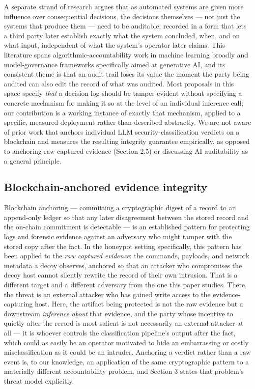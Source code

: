 \documentclass[journal,10pt,twocolumn]{IEEEtran}
\begin{document}
A separate strand of research argues that as automated systems are given more influence over consequential decisions, the decisions themselves --- not just the systems that produce them --- need to be auditable: recorded in a form that lets a third party later establish exactly what the system concluded, when, and on what input, independent of what the system's operator later claims. This literature spans algorithmic-accountability work in machine learning broadly and model-governance frameworks specifically aimed at generative AI, and its consistent theme is that an audit trail loses its value the moment the party being audited can also edit the record of what was audited. Most proposals in this space specify \emph{that} a decision log should be tamper-evident without specifying a concrete mechanism for making it so at the level of an individual inference call; our contribution is a working instance of exactly that mechanism, applied to a specific, measured deployment rather than described abstractly. We are not aware of prior work that anchors individual LLM security-classification verdicts on a blockchain and measures the resulting integrity guarantee empirically, as opposed to anchoring raw captured evidence (Section 2.5) or discussing AI auditability as a general principle.

\subsection{Blockchain-anchored evidence integrity}

Blockchain anchoring --- committing a cryptographic digest of a record to an append-only ledger so that any later disagreement between the stored record and the on-chain commitment is detectable --- is an established pattern for protecting logs and forensic evidence against an adversary who might tamper with the stored copy after the fact. In the honeypot setting specifically, this pattern has been applied to the \emph{raw captured evidence}: the commands, payloads, and network metadata a decoy observes, anchored so that an attacker who compromises the decoy host cannot silently rewrite the record of their own intrusion. That is a different target and a different adversary from the one this paper studies. There, the threat is an external attacker who has gained write access to the evidence-capturing host. Here, the artifact being protected is not the raw evidence but a downstream \emph{inference about} that evidence, and the party whose incentive to quietly alter the record is most salient is not necessarily an external attacker at all --- it is whoever controls the classification pipeline's output after the fact, which could as easily be an operator motivated to hide an embarrassing or costly misclassification as it could be an intruder. Anchoring a verdict rather than a raw event is, to our knowledge, an application of the same cryptographic pattern to a materially different accountability problem, and Section 3 states that problem's threat model explicitly.
\end{document}
